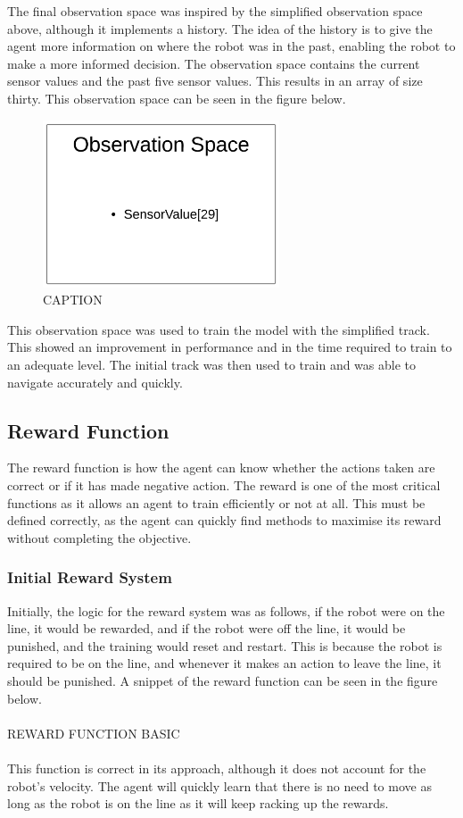 \documentclass[12pt]{article}
\begin{document}
The final observation space was inspired by the simplified observation space above, although it implements a history. The idea of the history is to give the agent more information on where the robot was in the past, enabling the robot to make a more informed decision. The observation space contains the current sensor values and the past five sensor values. This results in an array of size thirty. This observation space can be seen in the figure below.

\begin{figure}[H]
\label{fig:}
\centering
\includegraphics[width=7cm]{imgs/FinalObsSpace.png}
\caption{CAPTION}
\end{figure}

 
This observation space was used to train the model with the simplified track. This showed an improvement in performance and in the time required to train to an adequate level. The initial track was then used to train and was able to navigate accurately and quickly.
 


\subsection{Reward Function}

The reward function is how the agent can know whether the actions taken are correct or if it has made negative action. The reward is one of the most critical functions as it allows an agent to train efficiently or not at all. This must be defined correctly, as the agent can quickly find methods to maximise its reward without completing the objective.

\subsubsection{Initial Reward System}

Initially, the logic for the reward system was as follows, if the robot were on the line, it would be rewarded, and if the robot were off the line, it would be punished, and the training would reset and restart. This is because the robot is required to be on the line, and whenever it makes an action to leave the line, it should be punished. A snippet of the reward function can be seen in the figure below.
\\\\
REWARD FUNCTION BASIC
\\\\
This function is correct in its approach, although it does not account for the robot's velocity. The agent will quickly learn that there is no need to move as long as the robot is on the line as it will keep racking up the rewards.
 
\end{document}
